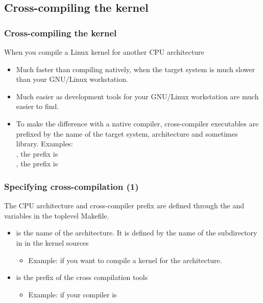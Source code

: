 \subsection{Cross-compiling the kernel}

\begin{frame}
  \frametitle{Cross-compiling the kernel}
  When you compile a Linux kernel for another CPU architecture
  \begin{itemize}
  \item Much faster than compiling natively, when the target system is
    much slower than your GNU/Linux workstation.
  \item Much easier as development tools for your GNU/Linux
    workstation are much easier to find.
  \item To make the difference with a native compiler, cross-compiler
    executables are prefixed by the name of the target system,
    architecture and sometimes
    library. Examples:\\
    \small
    , the prefix is \\
    , the prefix is 
  \end{itemize}
\end{frame}

\begin{frame}
  \frametitle{Specifying cross-compilation (1)}

  The CPU architecture and cross-compiler prefix are defined through
  the  and  variables in the toplevel
  Makefile.

  \begin{itemize}
  \item {} is the name of the architecture. It is defined by
    the name of the subdirectory in  in the kernel sources
    \begin{itemize}
    \item Example:  if you want to compile a kernel for
          the  architecture.
    \end{itemize}
  \item {} is the prefix of the cross compilation
    tools
    \begin{itemize}
    \item Example:  if your compiler is 
    \end{itemize}
  \end{itemize}
\end{frame}

